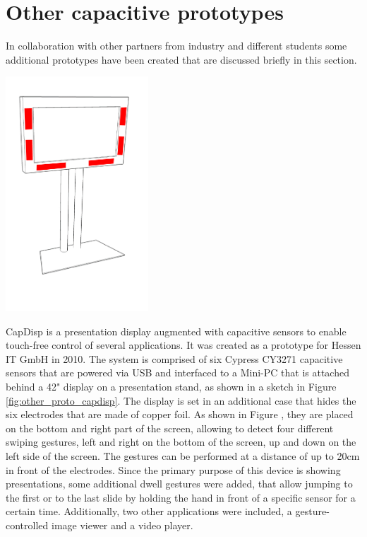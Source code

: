\section{Other capacitive prototypes}
In collaboration with other partners from industry and different students some additional prototypes have been created that are discussed briefly in this section. 

\begin{minipage}{\linewidth}
\centering
\includegraphics[width=0.4\textwidth]{images/other_proto_capdisp}
\label{fig:other_proto_capdisp}
\end{minipage}

CapDisp is a presentation display augmented with capacitive sensors to enable touch-free control of several applications. It was created as a prototype for Hessen IT GmbH in 2010. The system is comprised of six Cypress CY3271 capacitive sensors that are powered via USB and interfaced to a Mini-PC that is attached behind a 42" display on a presentation stand, as shown in a sketch in Figure \ref{fig:other_proto_capdisp}. The display is set in an additional case that hides the six electrodes that are made of copper foil. As shown in Figure , they are placed on the bottom and right part of the screen, allowing to detect four different swiping gestures, left and right on the bottom of the screen, up and down on the left side of the screen. The gestures can be performed at a distance of up to 20cm in front of the electrodes. Since the primary purpose of this device is showing presentations, some additional dwell gestures were added, that allow jumping to the first or to the last slide by holding the hand in front of a specific sensor for a certain time. Additionally, two other applications were included, a gesture-controlled image viewer and a video player.

